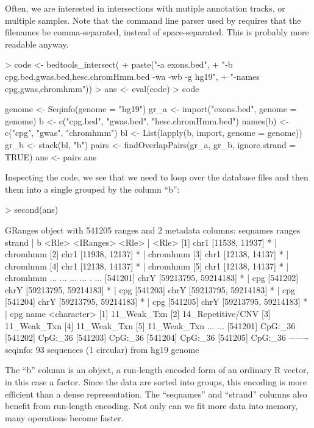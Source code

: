 \documentclass[10pt]{article}
\begin{document}
Often, we are interested in intersections with mutiple annotation
tracks, or multiple samples. Note that the command line parser used by
 requires that the filenames be comma-separated,
instead of space-separated. This is probably more readable anyway.
\begin{Schunk}
\begin{Sinput}
> code <- bedtools_intersect(
+     paste("-a exons.bed",
+           "-b cpg.bed,gwas.bed,hesc.chromHmm.bed -wa -wb -g hg19",
+           "-names cpg,gwas,chromhmm"))
> ans <- eval(code)
> code
\end{Sinput}
\begin{Soutput}
{
    genome <- Seqinfo(genome = "hg19")
    gr_a <- import("exons.bed", genome = genome)
    b <- c("cpg.bed", "gwas.bed", "hesc.chromHmm.bed")
    names(b) <- c("cpg", "gwas", "chromhmm")
    bl <- List(lapply(b, import, genome = genome))
    gr_b <- stack(bl, "b")
    pairs <- findOverlapPairs(gr_a, gr_b, ignore.strand = TRUE)
    ans <- pairs
    ans
}
\end{Soutput}
\end{Schunk}
Inspecting the code, we see that we need to loop over the database
files and then  them into a single 
grouped by the column ``b'':
\begin{Schunk}
\begin{Sinput}
> second(ans)
\end{Sinput}
\begin{Soutput}
GRanges object with 541205 ranges and 2 metadata columns:
           seqnames               ranges strand |        b
              <Rle>            <IRanges>  <Rle> |    <Rle>
       [1]     chr1       [11538, 11937]      * | chromhmm
       [2]     chr1       [11938, 12137]      * | chromhmm
       [3]     chr1       [12138, 14137]      * | chromhmm
       [4]     chr1       [12138, 14137]      * | chromhmm
       [5]     chr1       [12138, 14137]      * | chromhmm
       ...      ...                  ...    ... .      ...
  [541201]     chrY [59213795, 59214183]      * |      cpg
  [541202]     chrY [59213795, 59214183]      * |      cpg
  [541203]     chrY [59213795, 59214183]      * |      cpg
  [541204]     chrY [59213795, 59214183]      * |      cpg
  [541205]     chrY [59213795, 59214183]      * |      cpg
                        name
                 <character>
       [1]       11_Weak_Txn
       [2] 14_Repetitive/CNV
       [3]       11_Weak_Txn
       [4]       11_Weak_Txn
       [5]       11_Weak_Txn
       ...               ...
  [541201]           CpG:_36
  [541202]           CpG:_36
  [541203]           CpG:_36
  [541204]           CpG:_36
  [541205]           CpG:_36
  -------
  seqinfo: 93 sequences (1 circular) from hg19 genome
\end{Soutput}
\end{Schunk}
The ``b'' column is an  object, a run-length encoded form
of an ordinary R vector, in this case a factor.  Since the data are
sorted into groups, this encoding is more efficient than a dense
representation. The ``seqnames'' and ``strand'' columns also benefit
from run-length encoding. Not only can we fit more data into memory,
many operations become faster.
\end{document}
